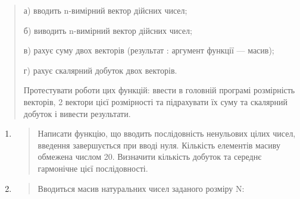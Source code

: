 \documentclass[]{article}
\begin{document}
\begin{quote}
а) вводить n-вимірний вектор дійсних чисел;

б) виводить n-вимірний вектор дійсних чисел;

в) рахує суму двох векторів (результат : аргумент функції --- масив);

г) рахує скалярний добуток двох векторів.

Протестувати роботи цих функцій: ввести в головній програмі розмірність
векторів, 2 вектори цієї розмірності та підрахувати їх суму та скалярний
добуток і вивести результати.
\end{quote}

\begin{enumerate}
\def\labelenumi{\arabic{enumi})}
\item
  \begin{quote}
  Написати функцію, що вводить послідовність ненульових цілих чисел,
  введення завершується при вводі нуля. Кількість елементів масиву
  обмежена числом 20. Визначити кількість добуток та середнє гармонічне
  цієї послідовності.
  \end{quote}
\item
  \begin{quote}
  Вводиться масив натуральних чисел заданого розміру N:
  \end{quote}
\end{enumerate}
\end{document}
